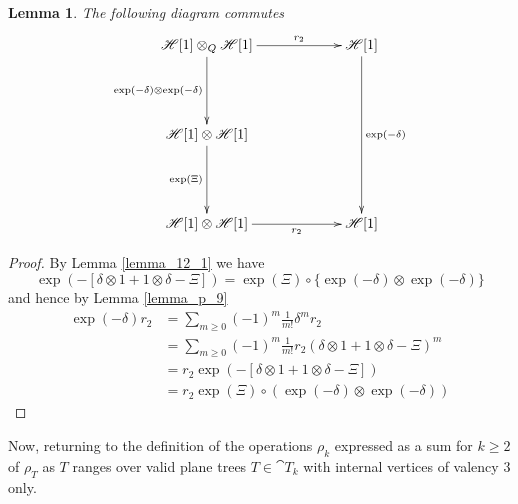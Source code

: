 \documentclass[english,letter paper,12pt,leqno]{article}
\newtheorem{lemma}[theorem]{Lemma}
\theoremstyle{example}
\numberwithin{equation}{section}
\def\be{\begin{equation}}
\def\ee{\end{equation}}
\begin{document}
\begin{lemma}\label{lemma_12_2} The following diagram commutes
\be
\xymatrix@C+3pc@R+2pc{
\mathscr{H}[1] \otimes_Q \mathscr{H}[1] \ar[d]_-{\exp(-\delta) \otimes \exp(-\delta)} \ar[r]^-{r_2} & \mathscr{H}[1] \ar[dd]^-{\exp(-\delta)}\\
\mathscr{H}[1] \otimes \mathscr{H}[1] \ar[d]_-{\exp(\Xi)}\\
\mathscr{H}[1] \otimes \mathscr{H}[1] \ar[r]_-{r_2} & \mathscr{H}[1]
}
\ee
\end{lemma}
\begin{proof}
By Lemma \ref{lemma_12_1} we have
\[
\exp(-[ \delta \otimes 1 + 1 \otimes \delta - \Xi]) = \exp(\Xi) \circ \{ \exp(-\delta) \otimes \exp(-\delta) \}
\]
and hence by Lemma \ref{lemma_p_9}
\begin{align*}
\exp(-\delta) r_2 &= \sum_{m \ge 0} (-1)^m \frac{1}{m!} \delta^m r_2\\
&= \sum_{m \ge 0} (-1)^m \frac{1}{m!} r_2( \delta \otimes 1 + 1 \otimes \delta - \Xi)^m\\
&= r_2 \exp(-[ \delta \otimes 1 + 1 \otimes \delta - \Xi])\\
&= r_2 \exp(\Xi) \circ( \exp(-\delta) \otimes \exp(-\delta) )
\end{align*}
\end{proof}

Now, returning to the definition of the operations $\rho_k$ expressed as a sum for $k \ge 2$ of $\rho_T$ as $T$ ranges over valid plane trees $T \in \cat{T}_k$ with internal vertices of valency $3$ only.
\end{document}
